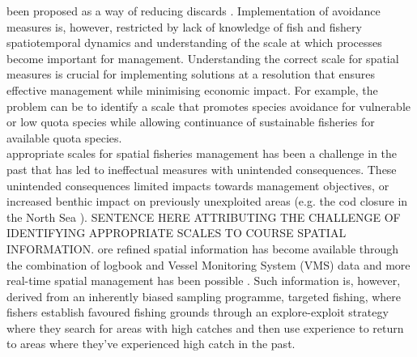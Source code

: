 \documentclass[review]{elsarticle}
\begin{document}
 been proposed as a way of reducing discards
.  
Implementation of avoidance measures is, however, restricted by lack of
knowledge of fish and fishery spatiotemporal dynamics and understanding of the
scale at which processes become important for management. Understanding the
correct scale for spatial measures is crucial for implementing solutions at a
resolution that ensures effective management \citep{Dunn2016} while minimising
economic impact.  For example, the problem can be to identify a scale that
promotes species avoidance for vulnerable or low quota species while allowing
continuance of sustainable fisheries for available quota species.\\

 appropriate
scales for spatial fisheries management has been a challenge in the past that
has led to ineffectual measures with unintended consequences. These unintended
consequences limited impacts towards management objectives, or increased
benthic impact on previously unexploited areas (e.g.  the cod closure in the
North Sea \citep{Rijnsdorp2001,Dinmore2003}). SENTENCE HERE ATTRIBUTING THE
CHALLENGE OF IDENTIFYING APPROPRIATE SCALES TO COURSE SPATIAL INFORMATION.
ore refined spatial information has  become
available through the combination of logbook and Vessel Monitoring System (VMS)
data \citep{Lee2010, Bastardie2010, Gerritsen2012, Mateo2016} and more
real-time spatial management has been possible \citep[e.g.][]{Holmes2011}.
Such
information is, however, derived from an inherently biased sampling programme,
targeted fishing, where fishers establish favoured fishing grounds through an
explore-exploit strategy \citep{Bailey2018} where they search for areas with
high catches and then use experience to return to areas where they've
experienced high catch in the past.  \\ 
\end{document}
